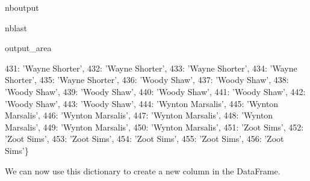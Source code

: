 \documentclass[letterpaper,10pt,english]{sphinxmanual}
\begin{document}
\begin{sphinxuseclass}{nboutput}
\begin{sphinxuseclass}{nblast}
{\begin{sphinxuseclass}{output_area}
\begin{sphinxuseclass}{}
\begin{sphinxVerbatim}[commandchars=\\\{\}]
 431: 'Wayne Shorter',
 432: 'Wayne Shorter',
 433: 'Wayne Shorter',
 434: 'Wayne Shorter',
 435: 'Wayne Shorter',
 436: 'Woody Shaw',
 437: 'Woody Shaw',
 438: 'Woody Shaw',
 439: 'Woody Shaw',
 440: 'Woody Shaw',
 441: 'Woody Shaw',
 442: 'Woody Shaw',
 443: 'Woody Shaw',
 444: 'Wynton Marsalis',
 445: 'Wynton Marsalis',
 446: 'Wynton Marsalis',
 447: 'Wynton Marsalis',
 448: 'Wynton Marsalis',
 449: 'Wynton Marsalis',
 450: 'Wynton Marsalis',
 451: 'Zoot Sims',
 452: 'Zoot Sims',
 453: 'Zoot Sims',
 454: 'Zoot Sims',
 455: 'Zoot Sims',
 456: 'Zoot Sims'\}
\end{sphinxVerbatim}



\end{sphinxuseclass}
\end{sphinxuseclass}
}

\end{sphinxuseclass}
\end{sphinxuseclass}
\sphinxAtStartPar
We can now use this dictionary to create a new column  in the  DataFrame.
\end{document}
